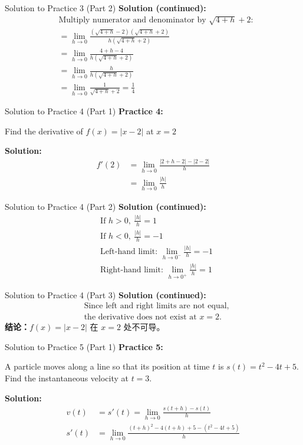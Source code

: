 \documentclass[aspectratio=169]{beamer}
\begin{document}
\begin{frame}{Solution to Practice 3 (Part 2)}
\textbf{Solution (continued):}
\[
\begin{aligned}
  &\text{Multiply numerator and denominator by } \sqrt{4+h} + 2: \\
  &= \lim_{h \to 0} \frac{(\sqrt{4+h} - 2)(\sqrt{4+h} + 2)}{h(\sqrt{4+h} + 2)} \\
  &= \lim_{h \to 0} \frac{4+h - 4}{h(\sqrt{4+h} + 2)} \\
  &= \lim_{h \to 0} \frac{h}{h(\sqrt{4+h} + 2)} \\
  &= \lim_{h \to 0} \frac{1}{\sqrt{4+h} + 2} = \frac{1}{4}
\end{aligned}
\]
\end{frame}

\begin{frame}{Solution to Practice 4 (Part 1)}
\textbf{Practice 4:}

Find the derivative of $f(x) = |x-2|$ at $x=2$

\textbf{Solution:}
\[
\begin{aligned}
  f'(2) &= \lim_{h \to 0} \frac{|2+h-2| - |2-2|}{h} \\
  &= \lim_{h \to 0} \frac{|h|}{h}
\end{aligned}
\]
\end{frame}

\begin{frame}{Solution to Practice 4 (Part 2)}
\textbf{Solution (continued):}
\[
\begin{aligned}
  &\text{If } h>0, \ \frac{|h|}{h} = 1 \\
  &\text{If } h<0, \ \frac{|h|}{h} = -1 \\
  &\text{Left-hand limit: } \lim_{h \to 0^-} \frac{|h|}{h} = -1 \\
  &\text{Right-hand limit: } \lim_{h \to 0^+} \frac{|h|}{h} = 1
\end{aligned}
\]
\end{frame}

\begin{frame}{Solution to Practice 4 (Part 3)}
\textbf{Solution (continued):}
\[
\begin{aligned}
  &\text{Since left and right limits are not equal,} \\
  &\text{the derivative does not exist at } x=2.
\end{aligned}
\]
\textbf{结论：}$f(x)=|x-2|$ 在 $x=2$ 处不可导。
\end{frame}

\begin{frame}{Solution to Practice 5 (Part 1)}
\textbf{Practice 5:}

A particle moves along a line so that its position at time $t$ is $s(t) = t^2 - 4t + 5$. Find the instantaneous velocity at $t=3$.

\textbf{Solution:}
\[
\begin{aligned}
  v(t) &= s'(t) = \lim_{h \to 0} \frac{s(t+h) - s(t)}{h} \\
  s'(t) &= \lim_{h \to 0} \frac{(t+h)^2 - 4(t+h) + 5 - (t^2 - 4t + 5)}{h}
\end{aligned}
\]
\end{frame}
\end{document}
